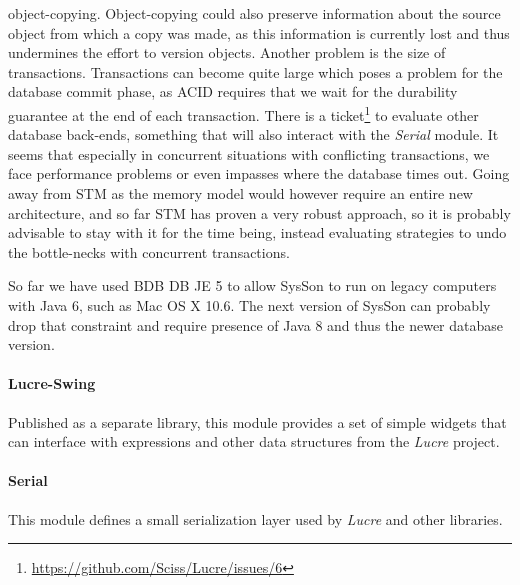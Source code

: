 \documentclass[11pt,a4paper]{article}
\newcommand{\software}[1]{\textit{#1}}
\newcommand{\sysson}[0]{SysSon}
\begin{document}
object-copying. Object-copying could also preserve information about the source object from which a copy was made, as this information is currently lost and thus undermines the effort to version objects. Another problem is the size of transactions. Transactions can become quite large which poses a problem for the database commit phase, as ACID requires that we wait for the durability guarantee at the end of each transaction. There is a ticket\footnote{\url{https://github.com/Sciss/Lucre/issues/6}} to evaluate other database back-ends, something that will also interact with the \software{Serial} module. It seems that especially in concurrent situations with conflicting transactions, we face performance problems or even impasses where the database times out. Going away from STM as the memory model would however require an entire new architecture, and so far STM has proven a very robust approach, so it is probably advisable to stay with it for the time being, instead evaluating strategies to undo the bottle-necks with concurrent transactions.

So far we have used BDB DB JE 5 to allow \sysson{} to run on legacy computers with Java 6, such as Mac OS X 10.6. The next version of \sysson{} can probably drop that constraint and require presence of Java 8 and thus the newer database version.

\paragraph{Lucre-Swing}

Published as a separate library, this module provides a set of simple widgets that can interface with expressions and other data structures from the \software{Lucre} project.

\paragraph{Serial}

This module defines a small serialization layer used by \software{Lucre} and other libraries.
\end{document}
